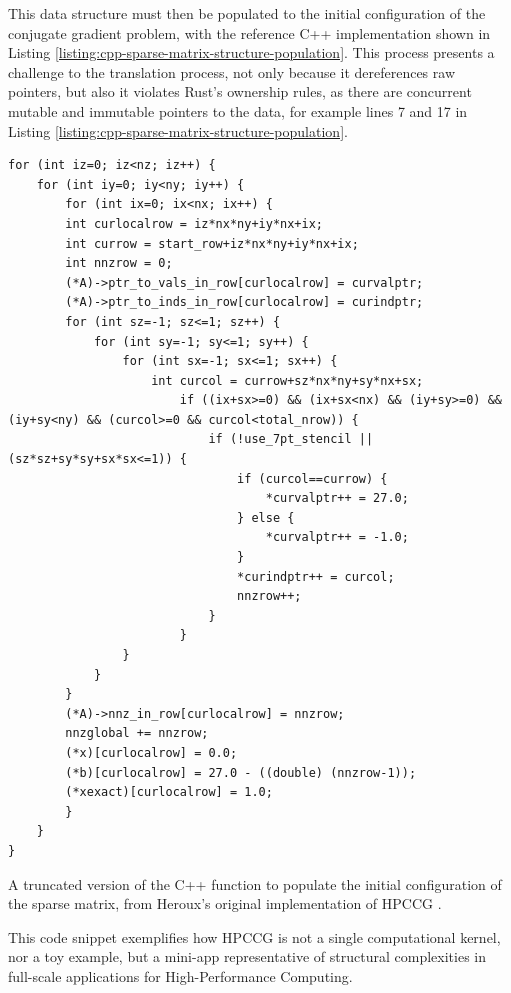 This data structure must then be populated to the initial configuration of the conjugate gradient problem, with the reference C++ implementation shown in Listing \ref{listing:cpp-sparse-matrix-structure-population}. This process presents a challenge to the translation process, not only because it dereferences raw pointers, but also it violates Rust's ownership rules, as there are concurrent mutable and immutable pointers to the data, for example lines 7 and 17 in Listing \ref{listing:cpp-sparse-matrix-structure-population}.

\begin{listing}[H]
    \begin{verbatim}
for (int iz=0; iz<nz; iz++) {
    for (int iy=0; iy<ny; iy++) {
        for (int ix=0; ix<nx; ix++) {
        int curlocalrow = iz*nx*ny+iy*nx+ix;
        int currow = start_row+iz*nx*ny+iy*nx+ix;
        int nnzrow = 0;
        (*A)->ptr_to_vals_in_row[curlocalrow] = curvalptr;
        (*A)->ptr_to_inds_in_row[curlocalrow] = curindptr;
        for (int sz=-1; sz<=1; sz++) {
            for (int sy=-1; sy<=1; sy++) {
                for (int sx=-1; sx<=1; sx++) {
                    int curcol = currow+sz*nx*ny+sy*nx+sx;
                        if ((ix+sx>=0) && (ix+sx<nx) && (iy+sy>=0) && (iy+sy<ny) && (curcol>=0 && curcol<total_nrow)) {
                            if (!use_7pt_stencil || (sz*sz+sy*sy+sx*sx<=1)) {
                                if (curcol==currow) {
                                    *curvalptr++ = 27.0;
                                } else {
                                    *curvalptr++ = -1.0;
                                }
                                *curindptr++ = curcol;
                                nnzrow++;
                            } 
                        }
                }
            }
        }
        (*A)->nnz_in_row[curlocalrow] = nnzrow;
        nnzglobal += nnzrow;
        (*x)[curlocalrow] = 0.0;
        (*b)[curlocalrow] = 27.0 - ((double) (nnzrow-1));
        (*xexact)[curlocalrow] = 1.0;
        }
    }
}
    \end{verbatim}
    \caption{A truncated version of the C++ function to populate the initial configuration of the sparse matrix, from Heroux's original implementation of HPCCG \cite{MantevoHPCCG2023}.}
    \label{listing:cpp-sparse-matrix-structure-population}
\end{listing}

This code snippet exemplifies how HPCCG is not a single computational kernel, nor a toy example, but a mini-app representative of structural complexities in full-scale applications for High-Performance Computing.

